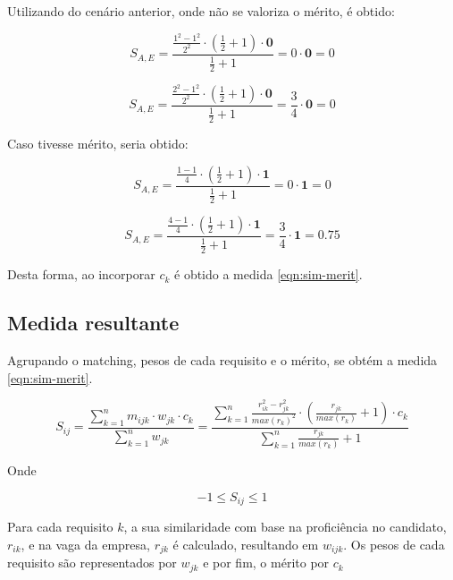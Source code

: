 \documentclass[preprint,12pt]{elsarticle}
\begin{document}
Utilizando do cenário anterior, onde não se valoriza o mérito, é obtido:

$$ S_{A,E} = \frac{\tfrac{1^2 - 1^2}{2^2} \cdot (\tfrac{1}{2} + 1) \cdot \textbf{0}}
                  {\tfrac{1}{2} + 1}
           = 0 \cdot \textbf{0} = 0 $$

$$ S_{A,E} = \frac{\tfrac{2^2 - 1^2}{2^2} \cdot (\tfrac{1}{2} + 1) \cdot \textbf{0}}
                  {\tfrac{1}{2} + 1}
           = \frac{3}{4} \cdot \textbf{0} = 0 $$

Caso tivesse mérito, seria obtido:

$$ S_{A,E} = \frac{\tfrac{1 - 1}{4} \cdot (\tfrac{1}{2} + 1) \cdot \textbf{1}}
                  {\tfrac{1}{2} + 1}
           = 0 \cdot \textbf{1} = 0 $$

$$ S_{A,E} = \frac{\tfrac{4 - 1}{4} \cdot (\tfrac{1}{2} + 1) \cdot \textbf{1}}
                  {\tfrac{1}{2} + 1}
           = \frac{3}{4} \cdot \textbf{1} = 0.75 $$
           
Desta forma, ao incorporar $c_{k}$ é obtido a medida \ref{eqn:sim-merit}.

\subsection{Medida resultante}

Agrupando o matching, pesos de cada requisito e o mérito, se obtém a medida \ref{eqn:sim-merit}.

\begin{equation}
\label{eqn:sim-merit}
S_{ij} =  \frac{\sum_{k=1}^n m_{ijk} \cdot w_{jk} \cdot c_k}
               {\sum_{k=1}^n w_{jk}} =
          \frac{\sum_{k=1}^n \frac{r_{ik}^2 - r_{jk}^2}{max(r_k)^2} \cdot (\frac{r_{jk}}{max(r_k)} + 1) \cdot c_{k}}
               {\sum_{k=1}^n {\frac{r_{jk}}{max(r_k)} + 1}}
\end{equation}

Onde

\begin{equation}
-1 \leq S_{ij} \leq 1
\end{equation}

Para cada requisito $k$, a sua similaridade com base na proficiência no candidato, $r_{ik}$, e na vaga da empresa, $r_{jk}$ é calculado, resultando em $w_{ijk}$. Os pesos de cada requisito são representados por $w_{jk}$ e por fim, o mérito por $c_k$

\end{document}
